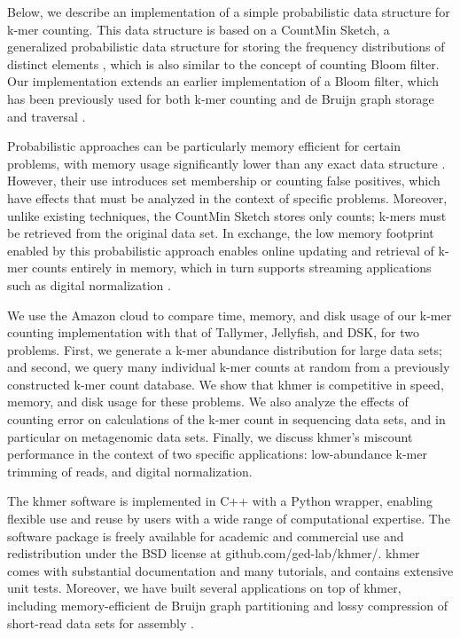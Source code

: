 \documentclass[10pt]{article}
\begin{document}

Below, we describe an implementation of a simple probabilistic data
structure for k-mer counting. This data structure is based on a
CountMin Sketch, a generalized probabilistic data structure for
storing the frequency distributions of distinct elements
\cite{Cormode2005}, which is also similar to the concept of 
counting Bloom filter\cite{Fan:2000:SCS:343571.343572}.  
Our implementation extends an earlier
implementation of a Bloom filter, which has been previously used for
both k-mer counting and de Bruijn graph storage and traversal
\cite{Bloom70,BroderM03,Melsted2011,Pell2012,Rizk2013,Jones:2012aa}.


Probabilistic approaches can be particularly memory efficient for
certain problems, with memory usage significantly lower than any exact
data structure \cite{Pell2012}.  However, their use introduces set
membership or counting false positives, which have effects that must
be analyzed in the context of specific problems.  Moreover, unlike
existing techniques, the CountMin Sketch stores only counts; k-mers
must be retrieved from the original data set.  In exchange, the low
memory footprint enabled by this probabilistic approach enables online
updating and retrieval of k-mer counts entirely in memory, which in
turn supports streaming applications such as digital normalization
\cite{Brown2012}.

We use the Amazon cloud to compare time, memory, and disk usage of our
k-mer counting implementation with that of Tallymer, Jellyfish, and
DSK, for two problems. First, we generate a k-mer abundance
distribution for large data sets; and second, we query many individual
k-mer counts at random from a previously constructed k-mer count
database.  We show that khmer is competitive in speed, memory, and
disk usage for these problems.  We also analyze the effects of
counting error on calculations of the k-mer count in sequencing data
sets, and in particular on metagenomic data sets.  Finally, we discuss
khmer's miscount performance in the context of two specific
applications: low-abundance k-mer trimming of reads, and digital
normalization.

The khmer software \cite{khmer} is implemented in C++ with a Python
wrapper, enabling flexible use and reuse by users with a wide range of
computational expertise.  The software package is freely available for
academic and commercial use and redistribution under the BSD license
at github.com/ged-lab/khmer/.  khmer comes with substantial
documentation and many tutorials, and contains extensive unit tests.
Moreover, we have built several applications on top of khmer,
including memory-efficient de Bruijn graph partitioning
\cite{Pell2012} and lossy compression of short-read data sets for
assembly \cite{Brown2012}.
\end{document}
